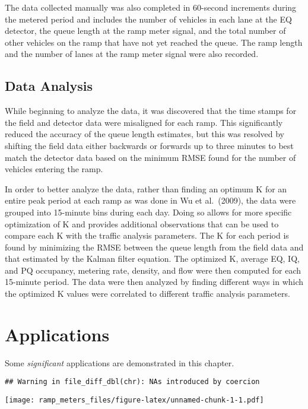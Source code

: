 \documentclass[numbered]{trbarticle}
\begin{document}
The data collected manually was also completed in 60-second increments during the metered period and includes the number of vehicles in each lane at the EQ detector, the queue length at the ramp meter signal, and the total number of other vehicles on the ramp that have not yet reached the queue. The ramp length and the number of lanes at the ramp meter signal were also recorded.

\hypertarget{data-analysis}{%
\subsection{Data Analysis}\label{data-analysis}}

While beginning to analyze the data, it was discovered that the time stamps for the field and detector data were misaligned for each ramp. This significantly reduced the accuracy of the queue length estimates, but this was resolved by shifting the field data either backwards or forwards up to three minutes to best match the detector data based on the minimum RMSE found for the number of vehicles entering the ramp.

In order to better analyze the data, rather than finding an optimum K for an entire peak period at each ramp as was done in Wu et al.~(2009), the data were grouped into 15-minute bins during each day. Doing so allows for more specific optimization of K and provides additional observations that can be used to compare each K with the traffic analysis parameters. The K for each period is found by minimizing the RMSE between the queue length from the field data and that estimated by the Kalman filter equation. The optimized K, average EQ, IQ, and PQ occupancy, metering rate, density, and flow were then computed for each 15-minute period. The data were then analyzed by finding different ways in which the optimized K values were correlated to different traffic analysis parameters.

\hypertarget{applications}{%
\section{Applications}\label{applications}}

Some \emph{significant} applications are demonstrated in this chapter.

\begin{verbatim}
## Warning in file_diff_dbl(chr): NAs introduced by coercion
\end{verbatim}

\texttt{[image: ramp\_meters\_files/figure-latex/unnamed-chunk-1-1.pdf]}
\end{document}

